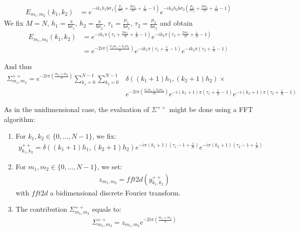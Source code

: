 \begin{align*}
E_{m_1,m_2}(k_1,k_2)
 &= e^{-ik_1h_1b\sigma_1\left(\frac{\mu_1}{b\sigma_1}+\frac{2m_1}{M}+\frac{1}{M}-1\right)}
    e^{-ik_2h_2b\sigma_2\left(\frac{\mu_2}{b\sigma_2}+\frac{2m_2}{M}+\frac{1}{M}-1\right)}
\end{align*}
We fix $M=N$, $h_1=\frac{\pi}{b\sigma_1}$, $h_2=\frac{\pi}{b\sigma_2}$, $\tau_1=\frac{\mu_1}{b\sigma_1}$, $\tau_2=\frac{\mu_2}{b\sigma_2}$ and obtain
\begin{align*}
E_{m_1,m_2}(k_1,k_2)
 &= e^{-ik_1\pi\left(\tau_1+\frac{2m_1}{N}+\frac{1}{N}-1\right)}
    e^{-ik_2\pi\left(\tau_2+\frac{2m_2}{N}+\frac{1}{N}-1\right)}\\
 &= e^{-2i\pi\left(\frac{k_1m_1+k_2m_2}{N}\right)}
    e^{-ik_1\pi\left(\tau_1+\frac{1}{N}-1\right)}
    e^{-ik_2\pi\left(\tau_2+\frac{1}{N}-1\right)}
\end{align*}

And thus
\begin{align*}
\Sigma_{m_1,m_2}^{++}=e^{-2i\pi\left(\frac{m_1+m_2}{N}\right)}\sum_{k_1=0}^{N-1}\sum_{k_2=0}^{N-1}
  &\delta\left((k_1+1)h_1,(k_2+1)h_2\right) \times\\
  & e^{-2i\pi\left(\frac{k_1m_1+k_2m_2}{N}\right)}
    e^{-i(k_1+1)\pi\left(\tau_1+\frac{1}{N}-1\right)}
    e^{-i(k_2+1)\pi\left(\tau_2+\frac{1}{N}-1\right)}
\end{align*}

As in the unidimensional case, the evaluation of $\Sigma^{++}$ might be done using a FFT algorithm:
\begin{enumerate}
\item For $k_1,k_2\in\{0,\hdots,N-1\}$, we fix:
\begin{align*}
y^{++}_{k_1,k_2}=\delta((k_1+1)h_1,(k_2+1)h_2)e^{-i\pi (k_1+1)\left(\tau_1-1+\frac{1}{N}\right)}e^{-i\pi (k_2+1)\left(\tau_2-1+\frac{1}{N}\right)}
\end{align*}
\item For $m_1,m_2\in\{0,\hdots,N-1\}$, we set:
\begin{align*}
  z_{m_1,m_2}=fft2d(y^{++}_{k_1,k_2})
\end{align*}
with $fft2d$ a bidimensional discrete Fourier transform.
\item The contribution $\Sigma_{m_1,m_2}^{++}$ equals to:
\begin{align*}
  \Sigma_{m_1,m_2}^{++}=z_{m_1,m_2}e^{-2i\pi\left(\frac{m_1+m_2}{N}\right)}
\end{align*}
\end{enumerate}

